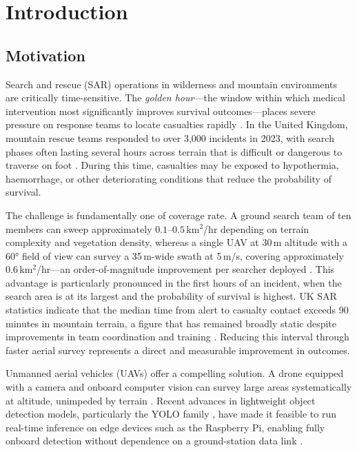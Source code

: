\section{Introduction}\label{sec:intro}

\subsection{Motivation}\label{sec:motivation}

Search and rescue (SAR) operations in wilderness and mountain environments are critically time-sensitive. The \textit{golden hour}---the window within which medical intervention most significantly improves survival outcomes---places severe pressure on response teams to locate casualties rapidly \cite{goodrich2008}. In the United Kingdom, mountain rescue teams responded to over 3{,}000 incidents in 2023, with search phases often lasting several hours across terrain that is difficult or dangerous to traverse on foot \cite{mra2023}. During this time, casualties may be exposed to hypothermia, haemorrhage, or other deteriorating conditions that reduce the probability of survival.

The challenge is fundamentally one of coverage rate. A ground search team of ten members can sweep approximately $0.1$--$0.5$\,km$^{2}$/hr depending on terrain complexity and vegetation density, whereas a single UAV at 30\,m altitude with a \ang{60} field of view can survey a 35\,m-wide swath at 5\,m/s, covering approximately $0.6$\,km$^{2}$/hr---an order-of-magnitude improvement per searcher deployed \cite{goodrich2008, murphy2014}. This advantage is particularly pronounced in the first hours of an incident, when the search area is at its largest and the probability of survival is highest. UK SAR statistics indicate that the median time from alert to casualty contact exceeds 90\,minutes in mountain terrain, a figure that has remained broadly static despite improvements in team coordination and training \cite{mra2023}. Reducing this interval through faster aerial survey represents a direct and measurable improvement in outcomes.

Unmanned aerial vehicles (UAVs) offer a compelling solution. A drone equipped with a camera and onboard computer vision can survey large areas systematically at altitude, unimpeded by terrain \cite{murphy2014}. Recent advances in lightweight object detection models, particularly the YOLO family \cite{yolohistory, yolov8}, have made it feasible to run real-time inference on edge devices such as the Raspberry Pi, enabling fully onboard detection without dependence on a ground-station data link \cite{edgeai}.

